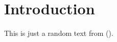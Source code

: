 \section{Introduction}
This is just a random text \cite{ref01} from \citeauthor{ref01} (\citeyear{ref01}).
